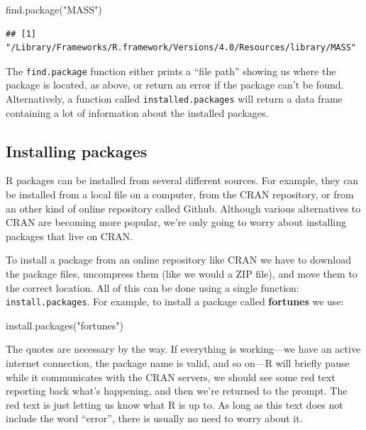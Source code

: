 \documentclass[
]{book}
\newenvironment{Shaded}{\begin{snugshade}}{\end{snugshade}}
\newcommand{\FunctionTok}[1]{\textcolor[rgb]{0.00,0.00,0.00}{#1}}
\newcommand{\NormalTok}[1]{#1}
\newcommand{\StringTok}[1]{\textcolor[rgb]{0.31,0.60,0.02}{#1}}
\begin{document}
\begin{Shaded}
\begin{Highlighting}[]
\FunctionTok{find.package}\NormalTok{(}\StringTok{"MASS"}\NormalTok{)}
\end{Highlighting}
\end{Shaded}

\begin{verbatim}
## [1] "/Library/Frameworks/R.framework/Versions/4.0/Resources/library/MASS"
\end{verbatim}

The \texttt{find.package} function either prints a ``file path'' showing us where the package is located, as above, or return an error if the package can't be found. Alternatively, a function called \texttt{installed.packages} will return a data frame containing a lot of information about the installed packages.

\hypertarget{installing-packages}{%
\subsection{Installing packages}\label{installing-packages}}

R packages can be installed from several different sources. For example, they can be installed from a local file on a computer, from the CRAN repository, or from an other kind of online repository called Github. Although various alternatives to CRAN are becoming more popular, we're only going to worry about installing packages that live on CRAN.

To install a package from an online repository like CRAN we have to download the package files, uncompress them (like we would a ZIP file), and move them to the correct location. All of this can be done using a single function: \texttt{install.packages}. For example, to install a package called \textbf{fortunes} we use:

\begin{Shaded}
\begin{Highlighting}[]
\FunctionTok{install.packages}\NormalTok{(}\StringTok{"fortunes"}\NormalTok{)}
\end{Highlighting}
\end{Shaded}

The quotes are necessary by the way. If everything is working---we have an active internet connection, the package name is valid, and so on---R will briefly pause while it communicates with the CRAN servers, we should see some red text reporting back what's happening, and then we're returned to the prompt. The red text is just letting us know what R is up to. As long as this text does not include the word ``error'', there is usually no need to worry about it.
\end{document}
